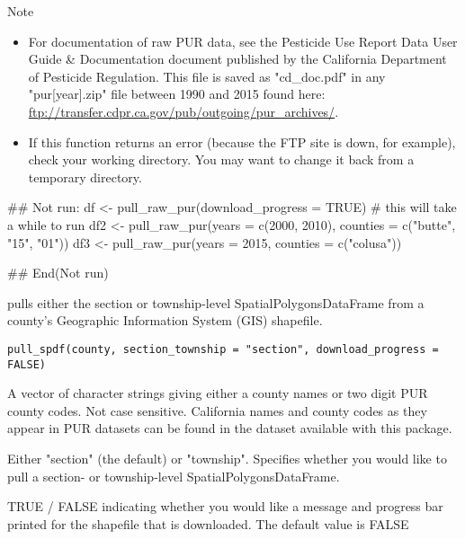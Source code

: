 \documentclass[a4paper]{book}
\begin{document}
\begin{Section}{Note}

\begin{itemize}

\item For documentation of raw PUR data, see the Pesticide Use
Report Data User Guide \& Documentation document published by the California
Department of Pesticide Regulation. This file is saved as "cd\_doc.pdf" in any
"pur[year].zip" file between 1990 and 2015 found here:
\url{ftp://transfer.cdpr.ca.gov/pub/outgoing/pur_archives/}.
\item If this function returns an error (because the FTP site is down, for
example), check your working directory. You may want to change it back from
a temporary directory.

\end{itemize}

\end{Section}
%
\begin{Examples}
\begin{ExampleCode}
## Not run:
df <- pull_raw_pur(download_progress = TRUE) # this will take a while to run
df2 <- pull_raw_pur(years = c(2000, 2010), counties = c("butte", "15", "01"))
df3 <- pull_raw_pur(years = 2015, counties = c("colusa"))

## End(Not run)
\end{ExampleCode}
\end{Examples}
%
\begin{Description}\relax
{} pulls either the section or township-level
SpatialPolygonsDataFrame from a county's Geographic Information System (GIS)
shapefile.
\end{Description}
%
\begin{Usage}
\begin{verbatim}
pull_spdf(county, section_township = "section", download_progress = FALSE)
\end{verbatim}
\end{Usage}
%
\begin{Arguments}
\begin{ldescription}
\item[\code{county}] A vector of character strings giving either a county names or
two digit PUR county codes. Not case sensitive. California names and county
codes as they appear in PUR datasets can be found in the 
dataset available with this package.

\item[\code{section\_township}] Either "section" (the default) or "township".
Specifies whether you would like to pull a section- or township-level
SpatialPolygonsDataFrame.

\item[\code{download\_progress}] TRUE / FALSE indicating whether you would like a
message and progress bar printed for the shapefile that is downloaded.
The default value is FALSE
\end{ldescription}
\end{Arguments}
\end{document}
